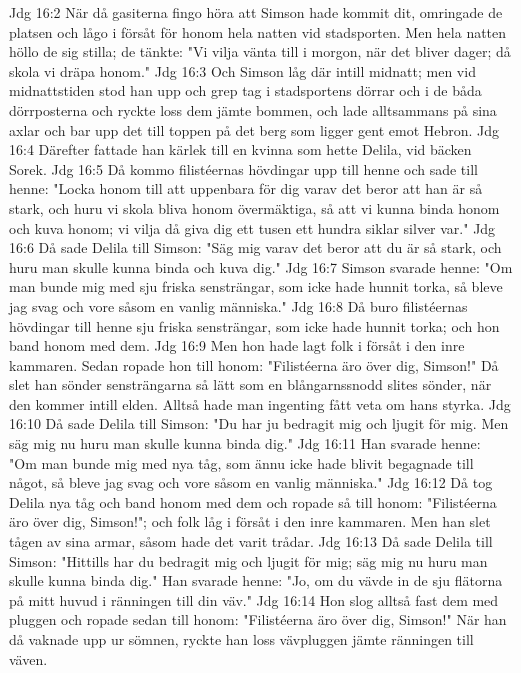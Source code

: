 Jdg 16:2  När då gasiterna fingo höra att Simson hade kommit dit, omringade de platsen och lågo i försåt för honom hela natten vid stadsporten. Men hela natten höllo de sig stilla; de tänkte: "Vi vilja vänta till i morgon, när det bliver dager; då skola vi dräpa honom."
Jdg 16:3  Och Simson låg där intill midnatt; men vid midnattstiden stod han upp och grep tag i stadsportens dörrar och i de båda dörrposterna och ryckte loss dem jämte bommen, och lade alltsammans på sina axlar och bar upp det till toppen på det berg som ligger gent emot Hebron.
Jdg 16:4  Därefter fattade han kärlek till en kvinna som hette Delila, vid bäcken Sorek.
Jdg 16:5  Då kommo filistéernas hövdingar upp till henne och sade till henne: "Locka honom till att uppenbara för dig varav det beror att han är så stark, och huru vi skola bliva honom övermäktiga, så att vi kunna binda honom och kuva honom; vi vilja då giva dig ett tusen ett hundra siklar silver var."
Jdg 16:6  Då sade Delila till Simson: "Säg mig varav det beror att du är så stark, och huru man skulle kunna binda och kuva dig."
Jdg 16:7  Simson svarade henne: "Om man bunde mig med sju friska sensträngar, som icke hade hunnit torka, så bleve jag svag och vore såsom en vanlig människa."
Jdg 16:8  Då buro filistéernas hövdingar till henne sju friska sensträngar, som icke hade hunnit torka; och hon band honom med dem.
Jdg 16:9  Men hon hade lagt folk i försåt i den inre kammaren. Sedan ropade hon till honom: "Filistéerna äro över dig, Simson!" Då slet han sönder sensträngarna så lätt som en blångarnssnodd slites sönder, när den kommer intill elden. Alltså hade man ingenting fått veta om hans styrka.
Jdg 16:10  Då sade Delila till Simson: "Du har ju bedragit mig och ljugit för mig. Men säg mig nu huru man skulle kunna binda dig."
Jdg 16:11  Han svarade henne: "Om man bunde mig med nya tåg, som ännu icke hade blivit begagnade till något, så bleve jag svag och vore såsom en vanlig människa."
Jdg 16:12  Då tog Delila nya tåg och band honom med dem och ropade så till honom: "Filistéerna äro över dig, Simson!"; och folk låg i försåt i den inre kammaren. Men han slet tågen av sina armar, såsom hade det varit trådar.
Jdg 16:13  Då sade Delila till Simson: "Hittills har du bedragit mig och ljugit för mig; säg mig nu huru man skulle kunna binda dig." Han svarade henne: "Jo, om du vävde in de sju flätorna på mitt huvud i ränningen till din väv."
Jdg 16:14  Hon slog alltså fast dem med pluggen och ropade sedan till honom: "Filistéerna äro över dig, Simson!" När han då vaknade upp ur sömnen, ryckte han loss vävpluggen jämte ränningen till väven.
